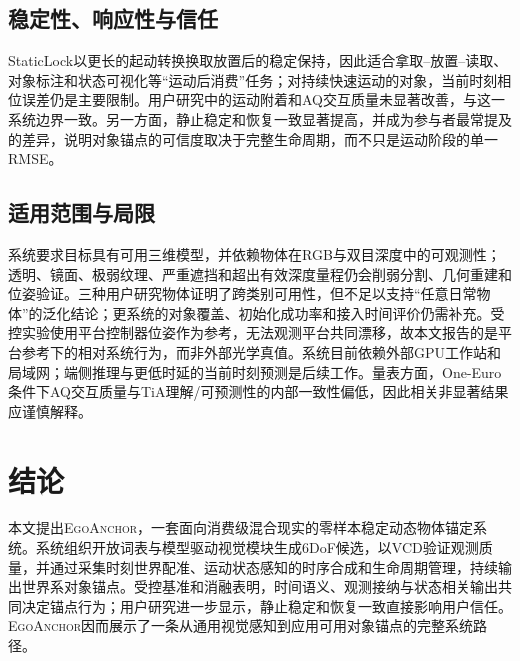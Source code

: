 \documentclass[10pt,journal,compsoc]{IEEEtran}
\newcommand{\oursname}{\textsc{EgoAnchor}}
\begin{document}
\subsection{稳定性、响应性与信任}
StaticLock以更长的起动转换换取放置后的稳定保持，因此适合拿取--放置--读取、对象标注和状态可视化等“运动后消费”任务；对持续快速运动的对象，当前时刻相位误差仍是主要限制。用户研究中的运动附着和AQ交互质量未显著改善，与这一系统边界一致。另一方面，静止稳定和恢复一致显著提高，并成为参与者最常提及的差异，说明对象锚点的可信度取决于完整生命周期，而不只是运动阶段的单一RMSE。

\subsection{适用范围与局限}
系统要求目标具有可用三维模型，并依赖物体在RGB与双目深度中的可观测性；透明、镜面、极弱纹理、严重遮挡和超出有效深度量程仍会削弱分割、几何重建和位姿验证。三种用户研究物体证明了跨类别可用性，但不足以支持“任意日常物体”的泛化结论；更系统的对象覆盖、初始化成功率和接入时间评价仍需补充。受控实验使用平台控制器位姿作为参考，无法观测平台共同漂移，故本文报告的是平台参考下的相对系统行为，而非外部光学真值。系统目前依赖外部GPU工作站和局域网；端侧推理与更低时延的当前时刻预测是后续工作。量表方面，One-Euro条件下AQ交互质量与TiA理解/可预测性的内部一致性偏低，因此相关非显著结果应谨慎解释。

\section{结论}
本文提出\oursname，一套面向消费级混合现实的零样本稳定动态物体锚定系统。系统组织开放词表与模型驱动视觉模块生成6DoF候选，以VCD验证观测质量，并通过采集时刻世界配准、运动状态感知的时序合成和生命周期管理，持续输出世界系对象锚点。受控基准和消融表明，时间语义、观测接纳与状态相关输出共同决定锚点行为；用户研究进一步显示，静止稳定和恢复一致直接影响用户信任。\oursname 因而展示了一条从通用视觉感知到应用可用对象锚点的完整系统路径。
\end{document}
